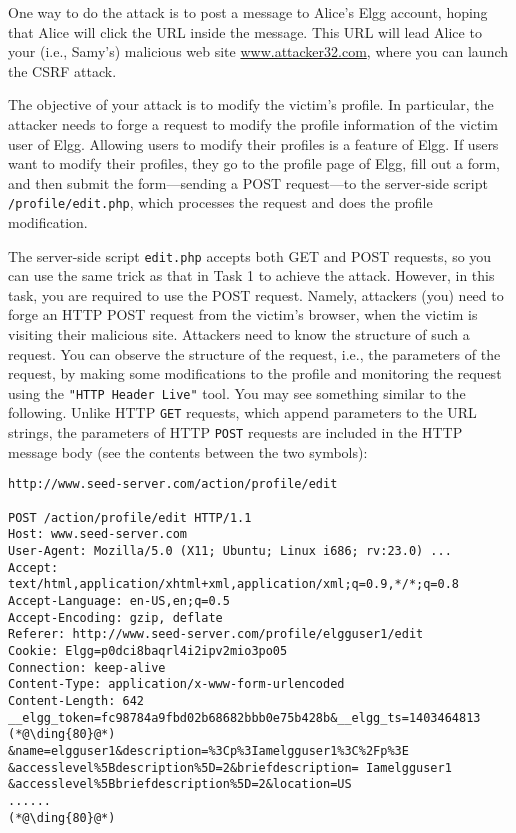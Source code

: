 One way to do the attack is to post a message to Alice's Elgg account, hoping that 
Alice will click the URL inside the message. This URL will lead Alice to your (i.e., Samy's)
malicious web site \url{www.attacker32.com}, where you can launch the
CSRF attack. 

The objective of your attack is to modify the victim's profile. 
In particular, the attacker needs to forge a request 
to modify the profile information of the victim user of Elgg. 
Allowing users to modify their profiles is a feature of 
Elgg. If  users want to modify their profiles,
they go to the profile page of Elgg, fill out 
a form, and then submit the form---sending a POST request---to 
the server-side script {\tt /profile/edit.php}, which 
processes the request and does the profile modification.


The server-side script {\tt edit.php} accepts both GET and POST requests,
so you can use the same trick as that in Task 1 to achieve the attack.
However, in this task, you are required to use the POST request. 
Namely, attackers (you) need to forge an HTTP POST request from the victim's
browser, when the victim is visiting their malicious site. 
Attackers need to know the structure of such a request.
You can observe the
structure of the request, i.e.,  the parameters of the request, by making
some modifications to the profile and monitoring the request using
the \texttt{"HTTP Header Live"} tool. 
You may see something similar to
the following. Unlike HTTP {\tt GET} requests, which append 
parameters to the URL strings, the parameters of HTTP {\tt POST} requests are 
included in the HTTP message body (see the contents between the two 
 symbols): 


\begin{lstlisting}
http://www.seed-server.com/action/profile/edit

POST /action/profile/edit HTTP/1.1
Host: www.seed-server.com
User-Agent: Mozilla/5.0 (X11; Ubuntu; Linux i686; rv:23.0) ...
Accept: text/html,application/xhtml+xml,application/xml;q=0.9,*/*;q=0.8
Accept-Language: en-US,en;q=0.5
Accept-Encoding: gzip, deflate
Referer: http://www.seed-server.com/profile/elgguser1/edit
Cookie: Elgg=p0dci8baqrl4i2ipv2mio3po05
Connection: keep-alive
Content-Type: application/x-www-form-urlencoded
Content-Length: 642
__elgg_token=fc98784a9fbd02b68682bbb0e75b428b&__elgg_ts=1403464813  (*@\ding{80}@*) 
&name=elgguser1&description=%3Cp%3Iamelgguser1%3C%2Fp%3E
&accesslevel%5Bdescription%5D=2&briefdescription= Iamelgguser1
&accesslevel%5Bbriefdescription%5D=2&location=US
......                                                              (*@\ding{80}@*)
\end{lstlisting}


